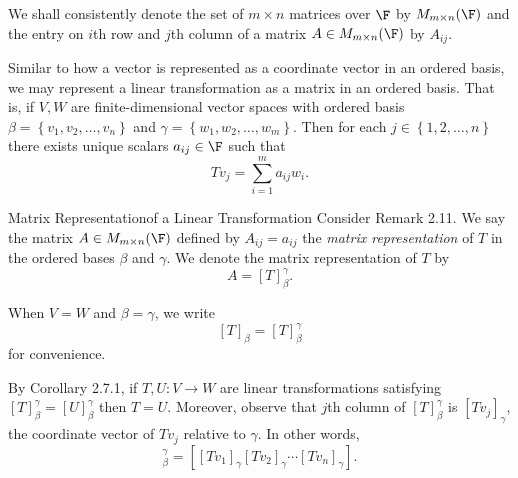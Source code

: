\documentclass[linearalgebra]{subfiles}
\begin{document}
    \begin{remark}
        We shall consistently denote the set of $m\times n$ matrices over $\F$ by $M_{m\times n}(\F)$ and the entry on $i$th row and $j$th column of a matrix $A\in M_{m\times n}(\F)$ by $A_{ij}$.
    \end{remark}

    \begin{remark}
        Similar to how a vector is represented as a coordinate vector in an ordered basis, we may represent a linear transformation as a matrix in an ordered basis. That is, if $V,W$ are finite-dimensional vector spaces with ordered basis $\beta = \left\lbrace v_1, v_2, \ldots, v_n \right\rbrace$ and $\gamma = \left\lbrace w_1, w_2, \ldots, w_m \right\rbrace$. Then for each $j\in \left\lbrace 1, 2, \ldots, n \right\rbrace$ there exists unique scalars $a_{ij}\in \F$ such that
        \begin{equation*}
            Tv_j = \sum^m_{i=1} a_{ij}w_i.
        \end{equation*}
    \end{remark}

    \begin{definition}{Matrix Representation}{of a Linear Transformation}
        Consider Remark 2.11. We say the matrix $A\in M_{m\times n}(\F)$ defined by $A_{ij}=a_{ij}$ the \emph{matrix representation} of $T$ in the ordered bases $\beta$ and $\gamma$. We denote the matrix representation of $T$ by 
        \begin{equation*}
            A = \left[ T \right]^\gamma_\beta.
        \end{equation*}
    \end{definition}

    \begin{remark}
        When $V=W$ and $\beta = \gamma$, we write
        \begin{equation*}
            \left[ T \right]_\beta = \left[ T \right]^\gamma_\beta
        \end{equation*}
        for convenience.
    \end{remark}

    \begin{remark}
        By Corollary 2.7.1, if $T, U: V\to W$ are linear transformations satisfying $[T]^\gamma_\beta = [U]^\gamma_\beta$ then $T=U$. Moreover, observe that $j$th column of $[T]^\gamma_\beta$ is $\left[ Tv_j \right] _\gamma$, the coordinate vector of $Tv_j$ relative to $\gamma$. In other words,
        \begin{equation*}
            [T]^\gamma_\beta = \left[ \left[ Tv_1 \right]_\gamma \left[ Tv_2 \right]_\gamma \cdots \left[ Tv_n \right]_\gamma \right].
        \end{equation*}
    \end{remark}
\end{document}
